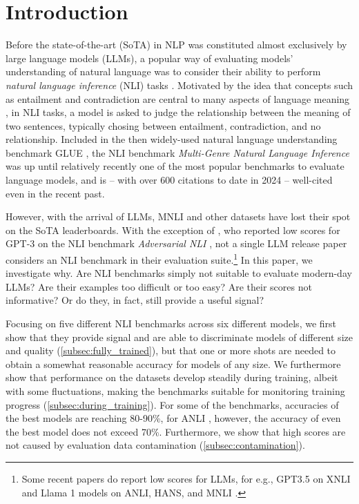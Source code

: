 \section{Introduction}

Before the state-of-the-art (SoTA) in NLP was constituted almost exclusively by large language models (LLMs), a popular way of evaluating models' understanding of natural language was to consider their ability to perform \emph{natural language inference} (NLI) tasks \citep[e.g.,][]{bowman-etal-2015-large,williams-etal-2018-broad}.
Motivated by the idea that concepts such as entailment and contradiction are central to many aspects of language meaning \citep{bowman-etal-2015-large}, in NLI tasks, a model is asked to judge the relationship between the meaning of two sentences, typically chosing between entailment, contradiction, and no relationship.
Included in the then widely-used natural language understanding benchmark GLUE \citep{wang2019glue}, the NLI benchmark \emph{Multi-Genre Natural Language Inference}  \citep[MNLI,][]{williams-etal-2018-broad} was up until relatively recently one of the most popular benchmarks to evaluate language models, and is -- with over 600 citations to date in 2024 -- well-cited even in the recent past.

However, with the arrival of LLMs, MNLI and other datasets have lost their spot on the SoTA leaderboards.
With the exception of \citet{brown2020language},  who reported low scores for GPT-3 on the NLI benchmark \emph{Adversarial NLI} \citep[ANLI,][]{nie-etal-2020-adversarial}, not a single LLM release paper considers an NLI benchmark in their evaluation suite.\footnote{Some recent papers do report low scores for LLMs, for e.g., GPT3.5 on XNLI \citep{ohmer2024form,ohmer-etal-2023-separating} and Llama 1 models on ANLI, HANS, and MNLI \citep{mccoy-etal-2019-right, weber-etal-2023-mind}.}
In this paper, we investigate why.
Are NLI benchmarks simply not suitable to evaluate modern-day LLMs? 
Are their examples too difficult or too easy?
Are their scores not informative?
Or do they, in fact, still provide a useful signal?

Focusing on five different NLI benchmarks across six different models, we first show that they provide signal and are able to discriminate models of different size and quality (\cref{subsec:fully_trained}), but that one or more shots are needed to obtain a somewhat reasonable accuracy for models of any size.
We furthermore show that performance on the datasets develop steadily during training, albeit with some fluctuations, making the benchmarks suitable for monitoring training progress (\cref{subsec:during_training}).
For some of the benchmarks, accuracies of the best models are reaching 80-90\%, for ANLI \citep{nie-etal-2020-adversarial}, however, the accuracy of even the best model does not exceed 70\%.
Furthermore, we show that high scores are not caused by evaluation data contamination (\cref{subsec:contamination}).

